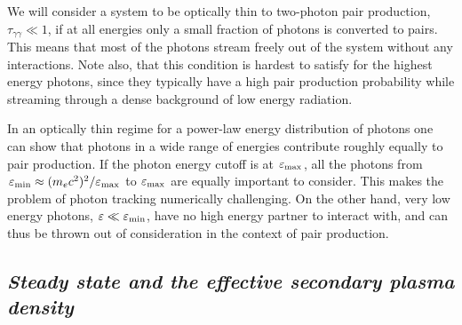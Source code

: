We will consider a system to be optically thin to two-photon pair production, $\tau_{\gamma\gamma}\ll 1$, if at all energies only a small fraction of photons is converted to pairs. This means that most of the photons stream freely out of the system without any interactions. Note also, that this condition is hardest to satisfy for the highest energy photons, since they typically have a high pair production probability while streaming through a dense background of low energy radiation.

In an optically thin regime for a power-law energy distribution of photons one can show that photons in a wide range of energies contribute roughly equally to pair production. If the photon energy cutoff is at $\varepsilon_{\rm max}$, all the photons from $\varepsilon_{\rm min} \approx (m_e c^2)^2/\varepsilon_{\rm max}$ to $\varepsilon_{\rm max}$ are equally important to consider. This makes the problem of photon tracking numerically challenging. On the other hand, very low energy photons, $\varepsilon \ll \varepsilon_{\rm min}$, have no high energy partner to interact with, and can thus be thrown out of consideration in the context of pair production.

\subsection*{\small \it Steady state and the effective secondary plasma density}

\begin{figure}[tb]
\end{figure}


